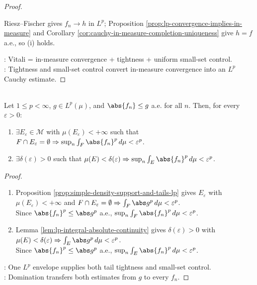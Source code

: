 \begin{theorem}
\begin{proof}
\begin{enumerate}[label=(\roman*)]
Riesz--Fischer gives $f_n\to h$ in $L^p$; Proposition \ref{prop:lp-convergence-implies-in-measure} and Corollary \ref{cor:cauchy-in-measure-completion-uniqueness} give $h=f$ a.e., so (i) holds.
\end{enumerate}
: Vitali = in-measure convergence + tightness + uniform small-set control.\\
: Tightness and small-set control convert in-measure convergence into an $L^p$ Cauchy estimate.
\end{proof}
\end{theorem}

\begin{corollary} \label{cor:domination-implies-vitali-side-conditions} \\
Let $1\leq p<\infty$, $g\in L^p(\mu)$, and $\abs{f_n}\leq g$ a.e. for all $n$. Then, for every $\varepsilon>0$:
\begin{enumerate}[label=(\roman*)]
\setlength{\itemsep}{0pt}
\item $\exists E_\varepsilon\in\mathcal M$ with $\mu(E_\varepsilon)<+\infty$ such that $F\cap E_\varepsilon=\emptyset\Rightarrow\sup_n\int_F\abs{f_n}^p\,d\mu<\varepsilon^p$.
\item $\exists\delta(\varepsilon)>0$ such that $\mu(E)<\delta(\varepsilon)\Rightarrow\sup_n\int_E\abs{f_n}^p\,d\mu<\varepsilon^p$.
\end{enumerate}
\begin{proof}
\begin{enumerate}[label=(\roman*)]
\setlength{\itemsep}{0pt}
\item Proposition \ref{prop:simple-density-support-and-tails-lp} gives $E_\varepsilon$ with $\mu(E_\varepsilon)<+\infty$ and $F\cap E_\varepsilon=\emptyset\Rightarrow\int_F\abs g^p\,d\mu<\varepsilon^p$.\\
Since $\abs{f_n}^p\leq\abs g^p$ a.e., $\sup_n\int_F\abs{f_n}^p\,d\mu<\varepsilon^p$.
\item Lemma \ref{lem:lp-integral-absolute-continuity} gives $\delta(\varepsilon)>0$ with $\mu(E)<\delta(\varepsilon)\Rightarrow\int_E\abs g^p\,d\mu<\varepsilon^p$.\\
Since $\abs{f_n}^p\leq\abs g^p$ a.e., $\sup_n\int_E\abs{f_n}^p\,d\mu<\varepsilon^p$.
\end{enumerate}
: One $L^p$ envelope supplies both tail tightness and small-set control.\\
: Domination transfers both estimates from $g$ to every $f_n$.
\end{proof}
\end{corollary}
